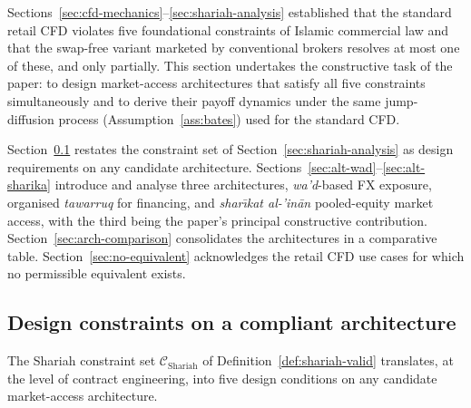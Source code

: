\documentclass[preprint,12pt,authoryear]{elsarticle}
\newcommand{\CC}{\mathcal{C}}
\theoremstyle{definition}
\begin{document}
Sections~\ref{sec:cfd-mechanics}--\ref{sec:shariah-analysis}
established that the standard retail CFD violates five foundational
constraints of Islamic commercial law and that the swap-free variant
marketed by conventional brokers resolves at most one of these, and
only partially. This section undertakes the constructive task of the
paper: to design market-access architectures that satisfy all five
constraints simultaneously and to derive their payoff dynamics under
the same jump-diffusion process (Assumption~\ref{ass:bates}) used for
the standard CFD.

Section~\ref{sec:design-constraints} restates the constraint set of
Section~\ref{sec:shariah-analysis} as design requirements on any
candidate architecture.
Sections~\ref{sec:alt-wad}--\ref{sec:alt-sharika} introduce and
analyse three architectures,
\emph{wa'd}-based FX exposure,
organised \emph{tawarruq} for financing, and
\emph{shar\={\i}kat al-'in\={a}n} pooled-equity market access, with
the third being the paper's principal constructive contribution.
Section~\ref{sec:arch-comparison} consolidates the architectures in a
comparative table. Section~\ref{sec:no-equivalent} acknowledges the
retail CFD use cases for which no permissible equivalent exists.

\subsection{Design constraints on a compliant architecture}
\label{sec:design-constraints}

The Shariah constraint set $\CC_{\text{Shariah}}$ of
Definition~\ref{def:shariah-valid} translates, at the level of
contract engineering, into five design conditions on any candidate
market-access architecture.
\end{document}
